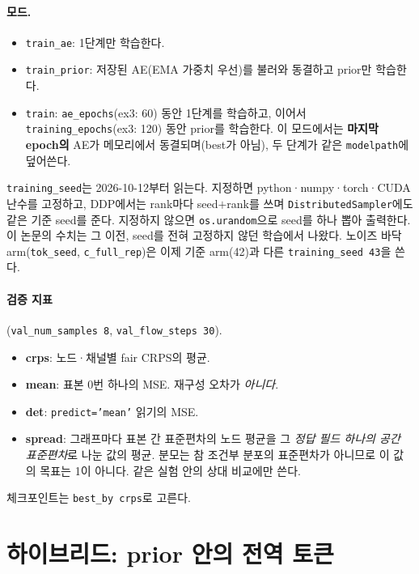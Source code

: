 \documentclass[11pt]{article}
\newcommand{\code}[1]{\texttt{#1}}
\begin{document}
\paragraph{모드.}
\begin{itemize}
\item \code{train\_ae}: 1단계만 학습한다.
\item \code{train\_prior}: 저장된 AE(EMA 가중치 우선)를 불러와 동결하고
  prior만 학습한다.
\item \code{train}: \code{ae\_epochs}(ex3: 60) 동안 1단계를 학습하고, 이어서
  \code{training\_epochs}(ex3: 120) 동안 prior를 학습한다. 이 모드에서는
  \textbf{마지막 epoch의} AE가 메모리에서 동결되며(best가 아님), 두 단계가
  같은 \code{modelpath}에 덮어쓴다.
\end{itemize}
\code{training\_seed}는 2026-10-12부터 읽는다. 지정하면 python·numpy·torch·CUDA
난수를 고정하고, DDP에서는 rank마다 seed$+$rank를 쓰며
\code{DistributedSampler}에도 같은 기준 seed를 준다. 지정하지 않으면
\code{os.urandom}으로 seed를 하나 뽑아 출력한다. 이 논문의 수치는 그 이전,
seed를 전혀 고정하지 않던 학습에서 나왔다. 노이즈 바닥 arm(\code{tok\_seed},
\code{c\_full\_rep})은 이제 기준 arm(42)과 다른 \code{training\_seed 43}을 쓴다.

\paragraph{검증 지표}(\code{val\_num\_samples 8}, \code{val\_flow\_steps 30}).
\begin{itemize}
\item \textbf{crps}: 노드·채널별 fair CRPS의 평균.
\item \textbf{mean}: 표본 0번 하나의 MSE. 재구성 오차가 \emph{아니다}.
\item \textbf{det}: \code{predict='mean'} 읽기의 MSE.
\item \textbf{spread}: 그래프마다 표본 간 표준편차의 노드 평균을 그
  \emph{정답 필드 하나의 공간 표준편차}로 나눈 값의 평균. 분모는 참 조건부
  분포의 표준편차가 아니므로 이 값의 목표는 1이 아니다. 같은 실험 안의 상대
  비교에만 쓴다.
\end{itemize}
체크포인트는 \code{best\_by crps}로 고른다.

\section{하이브리드: prior 안의 전역 토큰}\label{sec:token}
\end{document}
